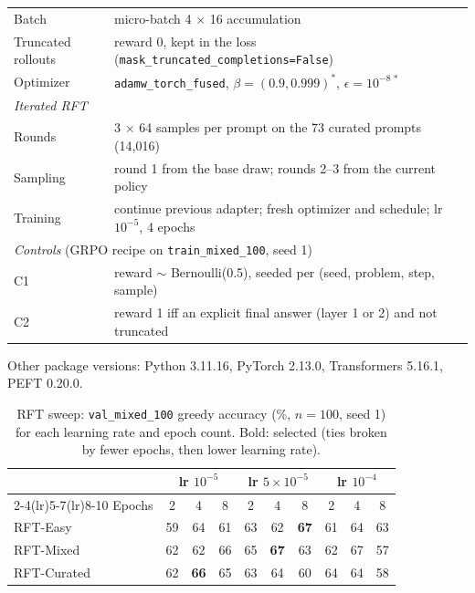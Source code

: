\documentclass{article}
\begin{document}
\begin{table}[!ht]
\begin{tabular}{ll}
Batch & micro-batch 4 $\times$ 16 accumulation \\
Truncated rollouts & reward 0, kept in the loss (\texttt{mask\_truncated\_completions=False}) \\
Optimizer & \texttt{adamw\_torch\_fused}, $\beta = (0.9, 0.999)^\ast$, $\epsilon = 10^{-8\,\ast}$ \\
\midrule
\multicolumn{2}{l}{\emph{Iterated RFT}} \\
Rounds & 3 $\times$ 64 samples per prompt on the 73 curated prompts (14{,}016) \\
Sampling & round 1 from the base draw; rounds 2--3 from the current policy \\
Training & continue previous adapter; fresh optimizer and schedule; lr $10^{-5}$, 4 epochs \\
\midrule
\multicolumn{2}{l}{\emph{Controls} (GRPO recipe on \texttt{train\_mixed\_100}, seed 1)} \\
C1 & reward $\sim$ Bernoulli(0.5), seeded per (seed, problem, step, sample) \\
C2 & reward 1 iff an explicit final answer (layer 1 or 2) and not truncated \\
\bottomrule
\end{tabular}
\end{table}

Other package versions: Python 3.11.16, PyTorch 2.13.0, Transformers 5.16.1, PEFT 0.20.0.

\begin{table}[!ht]
\centering\small
\caption{RFT sweep: \texttt{val\_mixed\_100} greedy accuracy (\%, $n = 100$, seed 1) for each learning rate and epoch count. Bold: selected (ties broken by fewer epochs, then lower learning rate).}
\label{tab:sweep}
\begin{tabular}{l ccc ccc ccc}
\toprule
 & \multicolumn{3}{c}{lr $10^{-5}$} & \multicolumn{3}{c}{lr $5{\times}10^{-5}$} & \multicolumn{3}{c}{lr $10^{-4}$} \\
\cmidrule(lr){2-4}\cmidrule(lr){5-7}\cmidrule(lr){8-10}
Epochs & 2 & 4 & 8 & 2 & 4 & 8 & 2 & 4 & 8 \\
\midrule
RFT-Easy    & 59 & 64 & 61 & 63 & 62 & \textbf{67} & 61 & 64 & 63 \\
RFT-Mixed   & 62 & 62 & 66 & 65 & \textbf{67} & 63 & 62 & 67 & 57 \\
RFT-Curated & 62 & \textbf{66} & 65 & 63 & 64 & 60 & 64 & 64 & 58 \\
\bottomrule
\end{tabular}
\end{table}
\end{document}
